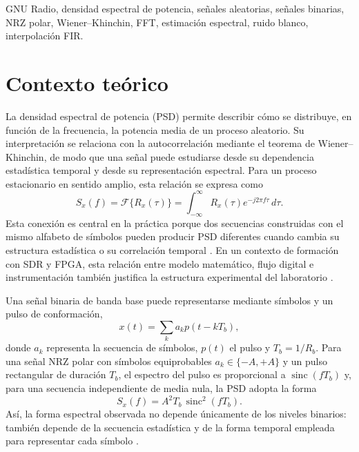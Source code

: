 \documentclass[journal]{IEEEtran}
\begin{document}
\begin{IEEEkeywords}
GNU Radio, densidad espectral de potencia, señales aleatorias, señales binarias, NRZ polar, Wiener--Khinchin, FFT, estimación espectral, ruido blanco, interpolación FIR.
\end{IEEEkeywords}

\section{Contexto teórico}

La densidad espectral de potencia (PSD) permite describir cómo se distribuye, en función de la frecuencia, la potencia media de un proceso aleatorio. Su interpretación se relaciona con la autocorrelación mediante el teorema de Wiener--Khinchin, de modo que una señal puede estudiarse desde su dependencia estadística temporal y desde su representación espectral. Para un proceso estacionario en sentido amplio, esta relación se expresa como
\begin{equation}
S_x(f)=\mathcal{F}\{R_x(\tau)\}
=\int_{-\infty}^{\infty}R_x(\tau)e^{-j2\pi f\tau}\,d\tau .
\label{eq:wiener}
\end{equation}
Esta conexión es central en la práctica porque dos secuencias construidas con el mismo alfabeto de símbolos pueden producir PSD diferentes cuando cambia su estructura estadística o su correlación temporal \cite{Picinbono2016}. En un contexto de formación con SDR y FPGA, esta relación entre modelo matemático, flujo digital e instrumentación también justifica la estructura experimental del laboratorio \cite{TorresGomez2021}.

Una señal binaria de banda base puede representarse mediante símbolos y un pulso de conformación,
\begin{equation}
x(t)=\sum_k a_k p(t-kT_b),
\label{eq:signal}
\end{equation}
donde $a_k$ representa la secuencia de símbolos, $p(t)$ el pulso y $T_b=1/R_b$. Para una señal NRZ polar con símbolos equiprobables $a_k\in\{-A,+A\}$ y un pulso rectangular de duración $T_b$, el espectro del pulso es proporcional a $\operatorname{sinc}(fT_b)$ y, para una secuencia independiente de media nula, la PSD adopta la forma
\begin{equation}
S_x(f)=A^2T_b\,\operatorname{sinc}^2(fT_b).
\label{eq:sinc2}
\end{equation}
Así, la forma espectral observada no depende únicamente de los niveles binarios: también depende de la secuencia estadística y de la forma temporal empleada para representar cada símbolo \cite{Rice2016,Bishop1998}.
\end{document}
